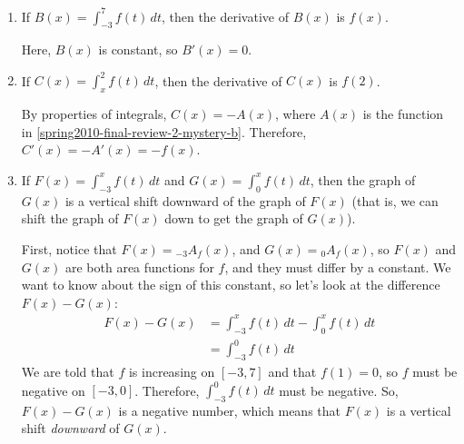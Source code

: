 \documentclass{article}
\begin{document}
\begin{enumerate}
\begin{enumerate}
  \item
    \begin{problem}
      If $\displaystyle B(x) = \int_{-3}^7 f(t) \,dt$, then the derivative
      of $B(x)$ is $f(x)$.
    \end{problem}


    \begin{solution}
      Here, $B(x)$ is constant, so $B'(x) = 0$. 
    \end{solution}

  \item
    \begin{problem}
      If $\displaystyle C(x) = \int_x^2 f(t)\,dt$, then the derivative of
      $C(x)$ is $f(2)$.
    \end{problem}


    \begin{solution}
      By properties of integrals, $C(x) = - A(x)$, where $A(x)$ is the
      function in \ref{spring2010-final-review-2-mystery-b}.  Therefore,
      $C'(x) = - A'(x) = -f(x)$. 
    \end{solution}

  \item

    \begin{problem}
      If $\displaystyle F(x) = \int_{-3}^x f(t) \,dt$ and $\displaystyle
      G(x) = \int_{0}^x f(t) \,dt$, then the graph of $G(x)$ is a vertical
      shift downward of the graph of $F(x)$ (that is, we can shift the
      graph of $F(x)$ down to get the graph of $G(x)$).
    \end{problem}


    \begin{solution}
      First, notice that $F(x) = {}_{-3} A_f(x)$, and $G(x) =
        {}_0 A_f(x)$, so $F(x)$ and $G(x)$ are both area functions for
        $f$, and they must differ by a constant.  We want to know about
        the sign of this constant, so let's look at the difference $F(x) -
        G(x)$:
      \begin{align*}
        F(x) - G(x) &= \int_{-3}^x f(t)\,dt - \int_{0}^x f(t)\,dt \\
        &= \int_{-3}^0 f(t)\,dt
      \end{align*}
      We are told that $f$ is increasing on $[-3, 7]$ and that $f(1) = 0$,
      so $f$ must be negative on $[-3, 0]$.  Therefore, $\displaystyle
      \int_{-3}^0 f(t)\,dt$ must be negative.  So, $F(x) - G(x)$ is a
      negative number, which means that $F(x)$ is a vertical shift
      \emph{downward} of $G(x)$.
    \end{solution}


\end{enumerate}
\end{enumerate}
\end{document}

